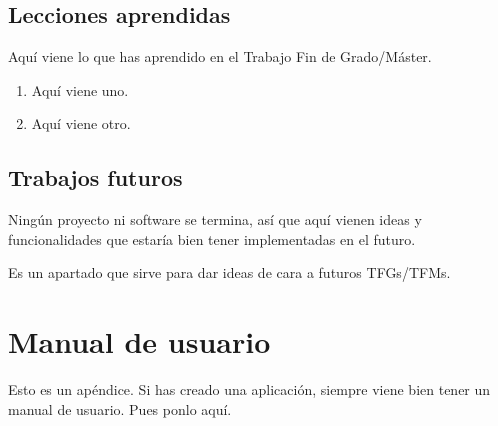 \documentclass[a4paper, 12pt]{book}
\begin{document}
\section{Lecciones aprendidas}
\label{sec:lecciones_aprendidas}

Aquí viene lo que has aprendido en el Trabajo Fin de Grado/Máster.

\begin{enumerate}
  \item Aquí viene uno.
  \item Aquí viene otro.
\end{enumerate}


\section{Trabajos futuros}
\label{sec:trabajos_futuros}

Ningún proyecto ni software se termina, así que aquí vienen ideas y funcionalidades que estaría bien tener implementadas en el futuro.

Es un apartado que sirve para dar ideas de cara a futuros TFGs/TFMs.



\cleardoublepage
\appendix
\chapter{Manual de usuario}
\label{app:manual}

Esto es un apéndice.
Si has creado una aplicación, siempre viene bien tener un manual de usuario.
Pues ponlo aquí.


\cleardoublepage


\end{document}
